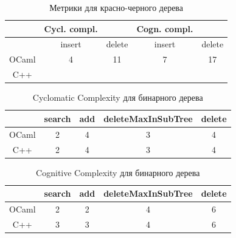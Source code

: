 \begin{center}
\begin{table}
\begin{tabular}{ | c  | c   c | c  c | } 
\hline
      & Cycl. compl.  &            & Cogn. compl. &  \\ \hline
      & insert       &    delete   &       insert   & delete \\ \hline 
OCaml &  4           &    11       &      7         &   17   \\ \hline
C++   &              &             &                &        \\ \hline
\end{tabular}
\caption{Метрики для красно-черного дерева}
\end{table}
\end{center}


\begin{center}    
\begin{table}[t]
\begin{tabular}{ | c | c | c | c | c | }
\hline
      & search & add  & deleteMaxInSubTree & delete \\ \hline 
OCaml &   2    &  4   &    3               &   4    \\  \hline
C++   &   2    &  4   &    3               &   4    \\ \hline
\end{tabular}
\caption{Cyclomatic Complexity для бинарного дерева}
\end{table}
\end{center}

\begin{center}
\begin{table}[t]
\begin{tabular}{ | c | c | c | c | c | }
\hline
      & search & add  & deleteMaxInSubTree & delete \\ \hline 
OCaml &   2    &  2   &    4               &   6    \\  \hline
C++   &   3    &   3  &    4               &   6    \\ \hline
\end{tabular}
\caption{Cognitive Complexity для бинарного дерева}
\end{table}
\end{center}

